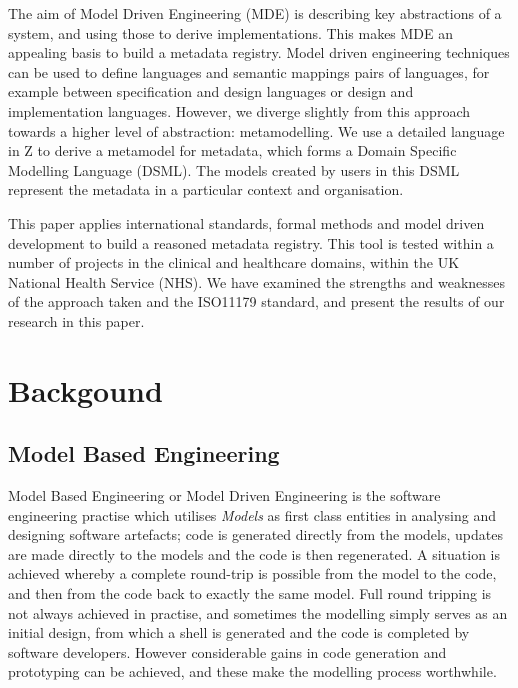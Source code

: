 \documentclass{llncs}
\begin{document}
The aim of Model Driven Engineering (MDE) is describing key abstractions of a system, and using those to derive implementations. This makes MDE an appealing basis to build a metadata registry. Model driven engineering techniques can be used to define languages and semantic mappings pairs of languages, for example between specification and design languages or design and implementation languages. However, we diverge slightly from this approach towards a higher level of abstraction: metamodelling. We use a detailed language in Z to derive a metamodel for metadata, which forms a Domain Specific Modelling Language (DSML). The models created by users in this DSML represent the metadata in a particular context and organisation. 

This paper applies international standards, formal methods and model driven development to build a reasoned metadata registry. This tool is tested within a number of projects in the clinical and healthcare domains, within the UK National Health Service (NHS). We have examined the strengths and weaknesses of the approach taken and the ISO11179 standard, and present the results of our research in this paper. 


\section{Backgound}

\subsection{Model Based Engineering}
Model Based Engineering or Model Driven Engineering is the software engineering practise which utilises \emph{Models} as first class entities in analysing and designing software artefacts; code is generated directly from the models, updates are made directly to the models and the code is then regenerated. A situation is achieved whereby a complete round-trip is possible from the model to the code, and then from the code back to exactly the same model. Full round tripping is not always achieved in practise, and sometimes the modelling simply serves as an initial design, from which a shell is generated and the code is completed by software developers. However considerable gains in code generation and prototyping can be achieved, and these make the modelling process worthwhile.
\end{document}
